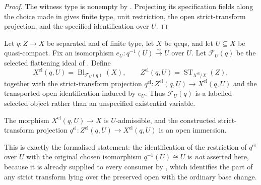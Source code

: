 \begin{proof}
  The witness type is nonempty by
  .  Projecting its specification
  fields along the choice made in
   gives finite type, unit restriction, the
  open strict-transform projection, and the specified identification over $U$.
\end{proof}

\begin{definition}
  \label{def:nagata-elimination-indeterminacy}
  \leanok

  Let $q\colon Z\to X$ be separated and of finite type, let $X$ be qcqs, and
  let $U\subseteq X$ be quasi-compact.  Fix an isomorphism
  $e_U\colon q^{-1}(U)\xrightarrow{\sim}U$ over $U$.
  Let $\mathcal F_U(q)$ be the selected flattening ideal of
  .  Define
  \[
    X^{\mathrm{el}}(q,U)=\operatorname{Bl}_{\mathcal F_U(q)}(X),
    \qquad
    Z^{\mathrm{el}}(q,U)=
      \operatorname{ST}_{X^{\mathrm{el}}/X}(Z),
  \]
  together with the strict-transform projection
  $q^{\mathrm{el}}\colon Z^{\mathrm{el}}(q,U)\to X^{\mathrm{el}}(q,U)$ and
  the transported open identification induced by $e_U$.
  Thus $\mathcal F_U(q)$ is a labelled selected object rather than an
  unspecified existential variable.
\end{definition}

\begin{lemma}
  \label{lemma:nagata-elimination-indeterminacy}
  \leanok

  The morphism $X^{\mathrm{el}}(q,U)\to X$ is $U$-admissible, and the
  constructed strict-transform projection
  $q^{\mathrm{el}}\colon Z^{\mathrm{el}}(q,U)\to X^{\mathrm{el}}(q,U)$ is
  an open immersion.

  This is exactly the formalised statement: the identification of the
  restriction of $q^{\mathrm{el}}$ over $U$ with the original chosen
  isomorphism $q^{-1}(U)\cong U$ is \emph{not} asserted here, because it is
  already supplied to every consumer by
  , which identifies the
  part of any strict transform lying over the preserved open with the ordinary
  base change.
\end{lemma}

